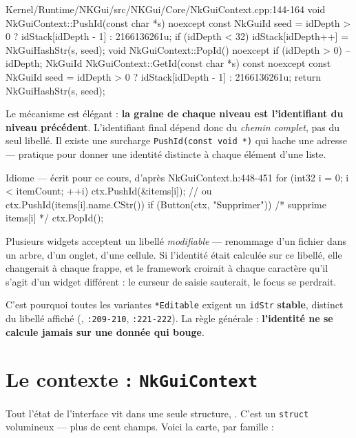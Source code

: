 \begin{nkcode}{Kernel/Runtime/NKGui/src/NKGui/Core/NkGuiContext.cpp:144-164}
void NkGuiContext::PushId(const char *s) noexcept {
    const NkGuiId seed = idDepth > 0 ? idStack[idDepth - 1] : 2166136261u;
    if (idDepth < 32) idStack[idDepth++] = NkGuiHashStr(s, seed);
}
void NkGuiContext::PopId() noexcept { if (idDepth > 0) --idDepth; }
NkGuiId NkGuiContext::GetId(const char *s) const noexcept {
    const NkGuiId seed = idDepth > 0 ? idStack[idDepth - 1] : 2166136261u;
    return NkGuiHashStr(s, seed);
}
\end{nkcode}

Le mécanisme est élégant : \textbf{la graine de chaque niveau est l'identifiant
du niveau précédent}. L'identifiant final dépend donc du \emph{chemin complet},
pas du seul libellé. Il existe une surcharge \texttt{PushId(const void *)} qui
hache une adresse — pratique pour donner une identité distincte à chaque élément
d'une liste.

\begin{nkcode}{Idiome — écrit pour ce cours, d'après NkGuiContext.h:448-451}
for (int32 i = 0; i < itemCount; ++i) {
    ctx.PushId(&items[i]);            // ou ctx.PushId(items[i].name.CStr())
    if (Button(ctx, "Supprimer")) { /* supprime items[i] */ }
    ctx.PopId();
}
\end{nkcode}

\begin{nkpiege}
Plusieurs widgets acceptent un libellé \emph{modifiable} — renommage d'un fichier
dans un arbre, d'un onglet, d'une cellule. Si l'identité était calculée sur ce
libellé, elle changerait à chaque frappe, et le framework croirait à chaque
caractère qu'il s'agit d'un widget différent : le curseur de saisie sauterait, le
focus se perdrait.

C'est pourquoi toutes les variantes \texttt{*Editable} exigent un
\texttt{idStr} \textbf{stable}, distinct du libellé affiché
(, \texttt{:209-210}, \texttt{:221-222}). La règle
générale : \textbf{l'identité ne se calcule jamais sur une donnée qui bouge}.
\end{nkpiege}

\section{Le contexte : \texttt{NkGuiContext}}

Tout l'état de l'interface vit dans une seule structure,
. C'est un
\texttt{struct} volumineux — plus de cent champs. Voici la carte, par famille :

